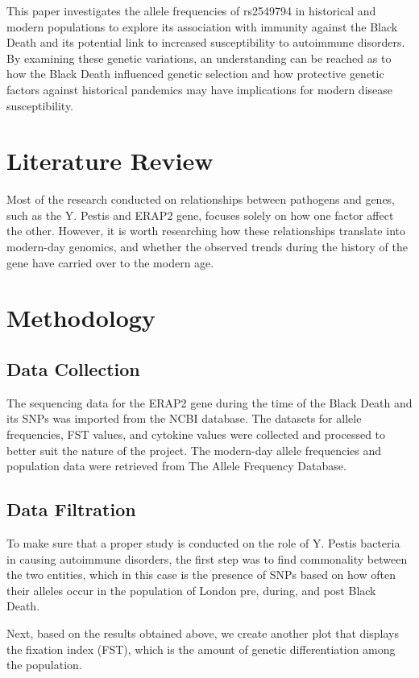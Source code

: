 \documentclass[a4paper, 12pt]{article}
\begin{document}
This paper investigates the allele frequencies of rs2549794 in historical and modern populations to explore its association with immunity against the Black Death and its potential link to increased susceptibility to autoimmune disorders. By examining these genetic variations, an understanding can be reached as to how the Black Death influenced genetic selection and how protective genetic factors against historical pandemics may have implications for modern disease susceptibility.

\section{Literature Review}
Most of the research conducted on relationships between pathogens and genes, such as the Y. Pestis and ERAP2 gene, focuses solely on how one factor affect the other. However, it is worth researching how these relationships translate into modern-day genomics, and whether the observed trends during the history of the gene have carried over to the modern age.

\section{Methodology}
\subsection{Data Collection}
The sequencing data for the ERAP2 gene during the time of the Black Death and its SNPs was imported from the NCBI database. The datasets for allele frequencies, FST values, and cytokine values were collected and processed to better suit the nature of the project. The modern-day allele frequencies and population data were retrieved from The Allele Frequency Database.

\subsection{Data Filtration}
To make sure that a proper study is conducted on the role of Y. Pestis bacteria in causing autoimmune disorders, the first step was to find commonality between the two entities, which in this case is the presence of SNPs based on how often their alleles occur in the population of London pre, during, and post Black Death.

Next, based on the results obtained above, we create another plot that displays the fixation index (FST), which is the amount of genetic differentiation among the population. 
\end{document}
